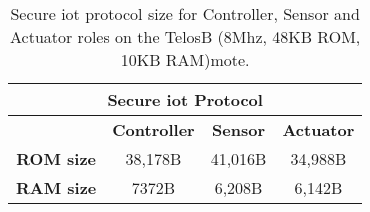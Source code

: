 \documentclass[conference]{./sty/IEEEtran}
\begin{document}
\begin{table}[h] %
  \begin{center} 
  \begin{tabular}{|c|c|c|c|} 
  \hline
  \multicolumn{4}{|c|}{\textbf{Secure iot Protocol}}\\ \hline
                    & \textbf{Controller} & \textbf{Sensor} & \textbf{Actuator} \\ \hline
  \textbf{ROM size} & 38,178B             & 41,016B         & 34,988B            \\ \hline
  \textbf{RAM size} & 7372B               & 6,208B          & 6,142B             \\ \hline
  \end{tabular}
  \caption[Table]{Secure iot protocol size for Controller, Sensor and Actuator roles on the TelosB (8Mhz, 48KB ROM, 10KB RAM)mote.}
  \label{tab:implementation}
  \end{center}
\end{table}
\vspace{-0.5cm}
\end{document}
